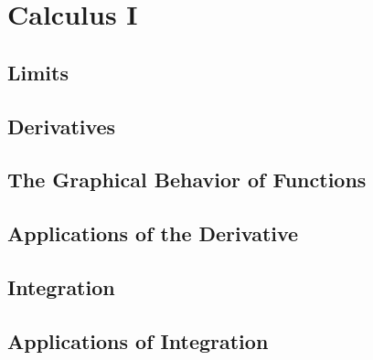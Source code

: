\part{Calculus I}

\chapter{Limits}\label{chapter:limits}
\thispagestyle{empty}







\clearpage{\pagestyle{empty}\cleardoublepage}
\chapter{Derivatives}\label{chapter:derivatives}
\thispagestyle{empty}







\clearpage{\pagestyle{empty}\cleardoublepage}
\chapter{The Graphical Behavior of Functions}\label{chapter:graphbehavior}
\thispagestyle{empty}






\clearpage{\pagestyle{empty}\cleardoublepage}
\chapter{Applications of the Derivative}\label{chapter:deriv_apps}
\thispagestyle{empty}





\clearpage{\pagestyle{empty}\cleardoublepage}
\chapter{Integration}\label{chapter:integration}
\thispagestyle{empty}






\clearpage{\pagestyle{empty}\cleardoublepage}
\chapter{Applications of Integration}\label{chapter:app_of_int}
\thispagestyle{empty}






